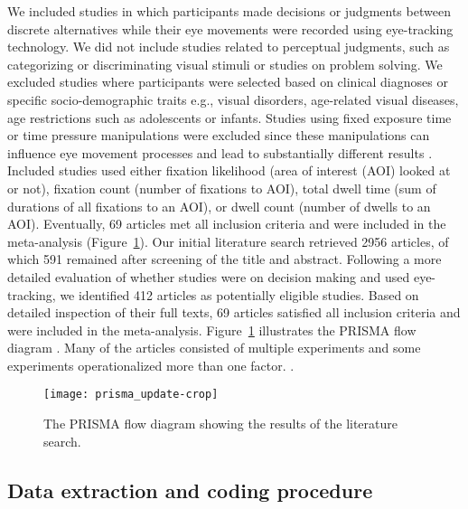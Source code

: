 We included studies in which participants made decisions or judgments between discrete alternatives while their eye movements were recorded using eye-tracking technology. We did not include studies related to perceptual judgments, such as categorizing or discriminating visual stimuli or studies on problem solving. We excluded studies where participants were selected based on clinical diagnoses or specific socio-demographic traits e.g., visual disorders, age-related visual diseases, age restrictions such as adolescents or infants. Studies using fixed exposure time or time pressure manipulations were excluded since these manipulations can influence eye movement processes \citep{orquin2018a} and lead to substantially different results \citep{simola2019a}. Included studies used either fixation likelihood (area of interest (AOI) looked at or not), fixation count (number of fixations to AOI), total dwell time (sum of durations of all fixations to an AOI), or dwell count (number of dwells to an AOI). Eventually, 69 articles met all inclusion criteria and were included in the meta-analysis (Figure~\ref{fig:flow_diagram}). Our initial literature search retrieved 2956 articles, of which 591 remained after screening of the title and abstract. Following a more detailed evaluation of whether studies were on decision making and used eye-tracking, we identified 412 articles as potentially eligible studies. Based on detailed inspection of their full texts, 69 articles satisfied all inclusion criteria and were included in the meta-analysis. Figure~\ref{fig:flow_diagram} illustrates the PRISMA flow diagram \citep{moher2009preferred}. Many of the articles consisted of multiple experiments and some experiments operationalized more than one factor. .


\begin{figure}[H]
\texttt{[image: prisma\_update-crop]}
\centering
\caption{The PRISMA flow diagram showing the results of the literature search.}
\label{fig:flow_diagram}
\end{figure}


\subsection{Data extraction and coding procedure}

